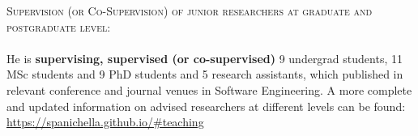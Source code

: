 \documentclass[12pt]{article}
\begin{document}
\textsc{Supervision (or Co-Supervision) of junior researchers at graduate and postgraduate level:}\\\\
He is \textbf{supervising, supervised (or co-supervised)} 9 undergrad students, 11 MSc students and  9 PhD students and 5 research assistants, which published in relevant conference and journal venues in Software Engineering. A more complete and updated information on advised researchers at different levels can be found: \href{https://spanichella.github.io/\#teaching}{https://spanichella.github.io/\#teaching}\\
\vspace{1.5mm}
%
%
%
%       
%
\end{document}
